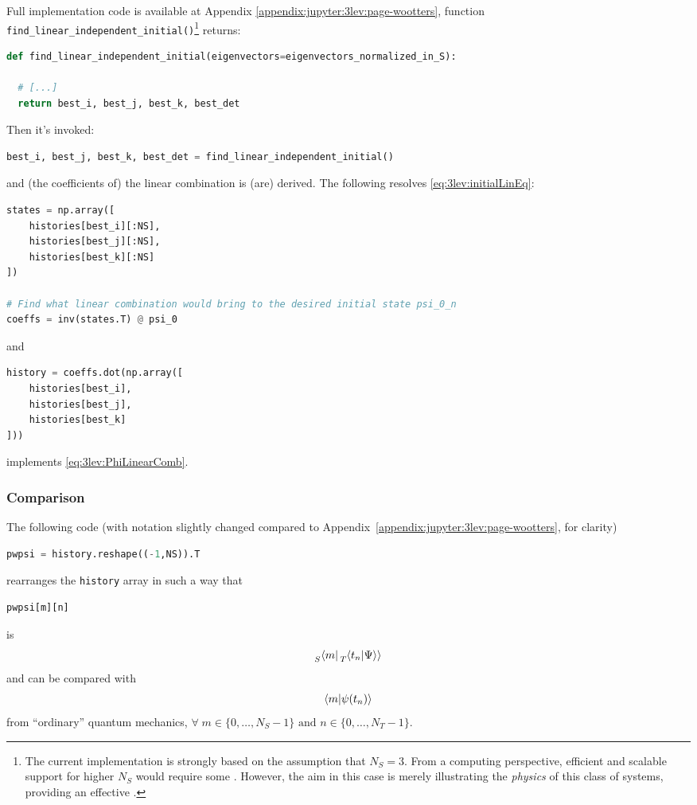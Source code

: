 Full implementation code is available at Appendix
\ref{appendix:jupyter:3lev:page-wootters},
function \\
\Verb#find_linear_independent_initial()#\footnote{
  The current implementation is strongly based on the assumption that $N_S = 3$.
  From a computing perspective,
  efficient and scalable support for higher $N_S$
  would require some  \parencite{comp:refactor}.
  However,
  the aim in this case is merely illustrating the \emph{physics} of this class of systems,
  providing an effective  \parencite{comp:poc}.
}
returns:
\begin{lstlisting}[language=Python]
def find_linear_independent_initial(eigenvectors=eigenvectors_normalized_in_S):

  # [...]
  return best_i, best_j, best_k, best_det
\end{lstlisting}
Then it's invoked:
\begin{lstlisting}[language=Python]
best_i, best_j, best_k, best_det = find_linear_independent_initial()
\end{lstlisting}
and (the coefficients of) the linear combination is (are) derived.
The following resolves \eqref{eq:3lev:initialLinEq}:
\begin{lstlisting}[language=Python]
states = np.array([
    histories[best_i][:NS],
    histories[best_j][:NS],
    histories[best_k][:NS]
])

# Find what linear combination would bring to the desired initial state psi_0_n
coeffs = inv(states.T) @ psi_0
\end{lstlisting}
and
\begin{lstlisting}[language=Python]
history = coeffs.dot(np.array([
    histories[best_i],
    histories[best_j],
    histories[best_k]
]))
\end{lstlisting}
implements \eqref{eq:3lev:PhiLinearComb}.

\subsubsection*{Comparison}

The following code
(with notation slightly changed compared to Appendix~\ref{appendix:jupyter:3lev:page-wootters}, for clarity)
\begin{lstlisting}[language=Python]
pwpsi = history.reshape((-1,NS)).T
\end{lstlisting}
rearranges the \Verb!history! array in such a way that
\begin{lstlisting}[language=Python]
pwpsi[m][n]
\end{lstlisting}
is
\begin{equation*}
\prescript{}{S}{\bra{m}} \prescript{}{T}{\!\left.\left\langle t_n \middle| \Psi \right\rangle\right\rangle}
\end{equation*}
and can be compared with
\begin{equation*}
  \braket{m}{\psi(t_n)} 
\end{equation*}
from ``ordinary'' quantum mechanics, $
  \forall \; m \in \{0, \dots, N_S - 1\} \text{ and } n \in \{0, \dots, N_T - 1\}
$.

